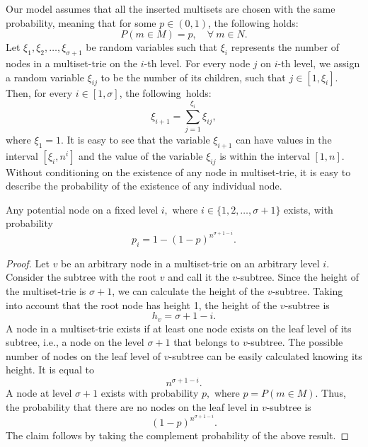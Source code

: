 \documentclass[algorithms,article,accept,pdftex,moreauthors]{Definitions/mdpi}
\begin{document}
Our model assumes that all the inserted multisets are chosen with the same probability,
meaning that for some $p\in (0,1)$, the following holds:
\[
P(m\in M) = p, \quad \forall~m\in N.
\]
%
Let %
 $\xi_1, \xi_2, \ldots, \xi_{\sigma+1}$ be random variables such that $\xi_i$
represents the number of nodes in a multiset-trie on the $i$-th level. For every node $j$ 
on $i$-th level, we assign a random variable $\xi_{ij}$ to be the number of its children, 
such that $j\in[1,\xi_i].$ Then, for every $i\in[1,\sigma]$, the following~holds:%
\begin{equation}\label{eq:sum_recursive}
\xi_{i+1} = \sum_{j=1}^{\xi_i} \xi_{ij},
\end{equation}
%
where $\xi_1 = 1.$
%
It is easy to see that the variable $\xi_{i+1}$ can have values in the interval
$[\xi_i,n^{i}]$ and the value of the variable $\xi_{ij}$ is within the interval $[1,n].$
Without conditioning on the existence of any node in multiset-trie, 
it is easy to describe the probability of the existence of any individual node.

\begin{Lemma}\label{l:prob-node-existence}
Any potential node on a fixed level $i,$ where $i\in \{ 1,2,\ldots, \sigma +1 \}$ exists, %
with probability
\begin{equation}
p_i=1-(1-p)^{n^{\sigma + 1 -i}}.
\end{equation}
\end{Lemma}
\begin{proof}
Let $v$ be an arbitrary node in a multiset-trie on an arbitrary level $i.$ Consider
the subtree with the root $v$ and call it the $v$-subtree. Since the height of the
multiset-trie is $\sigma + 1$, we can calculate the height of the $v$-subtree.
Taking into account that the root node has height 1, the height of the $v$-subtree is
%
\[
h_v = \sigma + 1 - i.
\]
%
A node in a multiset-trie exists if at least one node exists on the leaf level of its
subtree, i.e., a node on the level $\sigma + 1$ that belongs to $v$-subtree. The possible
number of nodes on the leaf level of $v$-subtree can be easily calculated knowing its height.
It is equal to
%
\[
n^{\sigma + 1 - i}.
\]
%
A node at level $\sigma+1$ exists with probability $p,$ where $p = P(m\in M).$
Thus, the probability that there are no nodes on the leaf level in $v$-subtree is
%
\[
(1-p)^{n^{\sigma +1 - i}}.
\]
%
The claim follows by taking the complement probability of the above result. 
\end{proof}
\end{document}
